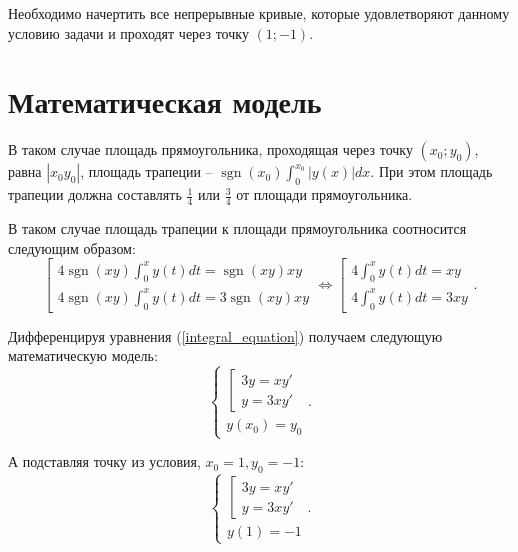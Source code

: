 \documentclass[a4paper,14pt]{extarticle}
\DeclareMathOperator{\sgn}{sgn}
\begin{document}
    Необходимо начертить все непрерывные кривые, которые удовлетворяют данному условию задачи и проходят через точку $(1; -1)$.

    \section{Математическая модель}
    В таком случае площадь прямоугольника, проходящая через точку $(x_0; y_0)$, равна $|x_0 y_0|$, площадь трапеции -- $\displaystyle \sgn(x_0) \int_{0}^{x_0} |y(x)| dx$. 
    При этом площадь трапеции должна составлять $\displaystyle \frac{1}{4}$ или $\displaystyle \frac{3}{4}$ от площади прямоугольника.

    В таком случае площадь трапеции к площади прямоугольника соотносится следующим образом:
    \begin{equation} \label{integral_equation}
        \left[
            \begin{array}{l}
                \displaystyle 4 \sgn(x y) \int_{0}^{x} y(t) dt = \sgn(x y) xy \\
                \displaystyle 4 \sgn(x y) \int_{0}^{x} y(t) dt = 3 \sgn(x y) xy 
            \end{array}
        \right. \Longleftrightarrow 
        \left[
            \begin{array}{l}
                \displaystyle 4 \int_{0}^{x} y(t) dt = xy \\
                \displaystyle 4 \int_{0}^{x} y(t) dt = 3 xy 
            \end{array}
        \right..
    \end{equation}

    Дифференцируя уравнения (\ref{integral_equation}) получаем следующую математическую модель:
    \begin{equation*}
        \begin{cases}
            \left[
                \begin{array}{l}
                    \displaystyle 3y = xy' \\
                    \displaystyle y = 3xy'
                \end{array}
            \right. \\
            y(x_0) = y_0
        \end{cases}.
    \end{equation*}

    А подставляя точку из условия, $x_0 = 1, y_0 = -1$:
    \begin{equation} \label{model}
        \begin{cases}
            \left[
                \begin{array}{l}
                    \displaystyle 3y = xy' \\
                    \displaystyle y = 3xy'
                \end{array}
            \right. \\
            y(1) = -1
        \end{cases}.
    \end{equation}
\end{document}
